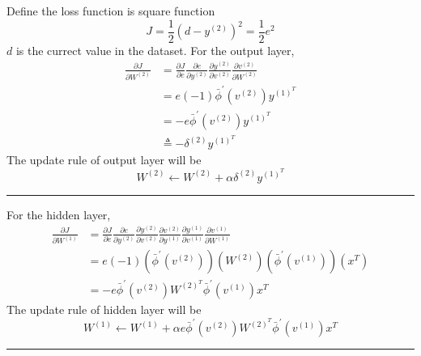 \documentclass[a4paper, 12pt, AutoFakeBold]{report}
\begin{document}
    Define the loss function is square function
    \begin{equation}
        J = \frac{1}{2}(d-y^{(2)})^2 = \frac{1}{2}e^2
    \end{equation}
    $d$ is the currect value in the dataset. For the output layer,
    \begin{align}
        \frac{\partial J}{\partial W^{(2)}}
        &= \frac{\partial J}{\partial e}\frac{\partial e}{\partial y^{(2)}}\frac{\partial y^{(2)}}{\partial v^{(2)}}\frac{\partial v^{(2)}}{\partial W^{(2)}} \nonumber \\
        &= e(-1)\bar{\phi}^\prime(v^{(2)})y^{(1)^T} \nonumber \\
        &= -e\bar{\phi}^\prime(v^{(2)})y^{(1)^T} \nonumber \\
        &\triangleq -\delta^{(2)}y^{(1)^T}
    \end{align}
    The update rule of output layer will be
    \begin{equation}
        W^{(2)} \leftarrow W^{(2)} + \alpha\delta^{(2)}y^{(1)^T}
    \end{equation}
    \hrule
    For the hidden layer,
    \begin{align}
        \frac{\partial J}{\partial W^{(1)}}
        &= \frac{\partial J}{\partial e}\frac{\partial e}{\partial y^{(2)}}\frac{\partial y^{(2)}}{\partial v^{(2)}}\frac{\partial v^{(2)}}{\partial y^{(1)}}\frac{\partial y^{(1)}}{\partial v^{(1)}}\frac{\partial v^{(1)}}{\partial W^{(1)}} \\
        &= e(-1)(\bar{\phi}^\prime(v^{(2)}))(W^{(2)})(\bar{\phi}^\prime(v^{(1)}))(x^T) \\
        &= -e\bar{\phi}^\prime(v^{(2)})W^{(2)^T}\bar{\phi}^\prime(v^{(1)})x^T
    \end{align}
    The update rule of hidden layer will be
    \begin{equation}
        W^{(1)} \leftarrow W^{(1)} + \alpha e\bar{\phi}^\prime(v^{(2)})W^{(2)^T}\bar{\phi}^\prime(v^{(1)})x^T
    \end{equation}
    \hrule
\end{document}
